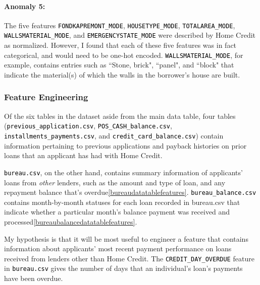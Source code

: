 \documentclass[12pt, letterpaper]{article}
\begin{document}
\paragraph{Anomaly 5:}
The five features \colorbox{backcolor}{\textcolor{black}{\texttt{FONDKAPREMONT_MODE}}}, \colorbox{backcolor}{\textcolor{black}{\texttt{HOUSETYPE_MODE}}}, \colorbox{backcolor}{\textcolor{black}{\texttt{TOTALAREA_MODE}}}, \colorbox{backcolor}{\textcolor{black}{\texttt{WALLSMATERIAL_MODE}}}, and \colorbox{backcolor}{\textcolor{black}{\texttt{EMERGENCYSTATE_MODE}}} were described by Home Credit as normalized. However, I found that each of these five features was in fact categorical, and would need to be one-hot encoded. \colorbox{backcolor}{\textcolor{black}{\texttt{WALLSMATERIAL_MODE}}}, for example, contains entries such as ``Stone, brick", ``panel", and ``block" that indicate the material(s) of which the walls in the borrower's house are built.

\subsubsection{Feature Engineering}
Of the six tables in the dataset aside from the main data table, four tables (\colorbox{backcolor}{\textcolor{black}{\texttt{previous_application.csv}}}, \colorbox{backcolor}{\textcolor{black}{\texttt{POS_CASH_balance.csv}}}, \colorbox{backcolor}{\textcolor{black}{\texttt{installments_payments.csv}}}, and \colorbox{backcolor}{\textcolor{black}{\texttt{credit_card_balance.csv}}}) contain information pertaining to previous applications and payback histories on prior loans that an applicant has had with Home Credit.

\colorbox{backcolor}{\textcolor{black}{\texttt{bureau.csv}}}, on the other hand, contains summary information of applicants' loans from \textit{other} lenders, such as the amount and type of loan, and any repayment balance that's overdue\ref{bureaudatatablefeatures}. \colorbox{backcolor}{\textcolor{black}{\texttt{bureau_balance.csv}}} contains month-by-month statuses for each loan recorded in bureau.csv that indicate whether a particular month's balance payment was received and processed\ref{bureaubalancedatatablefeatures}.

My hypothesis is that it will be most useful to engineer a feature that contains information about applicants' most recent payment performance on loans received from lenders other than Home Credit. The \colorbox{backcolor}{\textcolor{black}{\texttt{CREDIT_DAY_OVERDUE}}} feature in \colorbox{backcolor}{\textcolor{black}{\texttt{bureau.csv}}} gives the number of days that an individual's loan's payments have been overdue.
\end{document}
